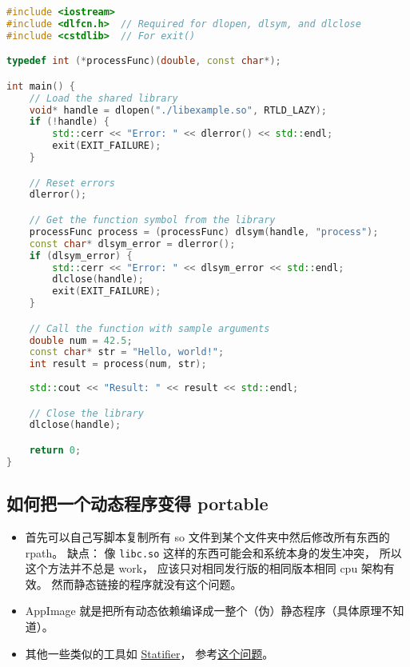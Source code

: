 \begin{lstlisting}[language=cpp]
#include <iostream>
#include <dlfcn.h>  // Required for dlopen, dlsym, and dlclose
#include <cstdlib>  // For exit()

typedef int (*processFunc)(double, const char*);

int main() {
    // Load the shared library
    void* handle = dlopen("./libexample.so", RTLD_LAZY);
    if (!handle) {
        std::cerr << "Error: " << dlerror() << std::endl;
        exit(EXIT_FAILURE);
    }

    // Reset errors
    dlerror();

    // Get the function symbol from the library
    processFunc process = (processFunc) dlsym(handle, "process");
    const char* dlsym_error = dlerror();
    if (dlsym_error) {
        std::cerr << "Error: " << dlsym_error << std::endl;
        dlclose(handle);
        exit(EXIT_FAILURE);
    }

    // Call the function with sample arguments
    double num = 42.5;
    const char* str = "Hello, world!";
    int result = process(num, str);
    
    std::cout << "Result: " << result << std::endl;

    // Close the library
    dlclose(handle);

    return 0;
}

\end{lstlisting}

\subsection{如何把一个动态程序变得 portable}
\begin{itemize}
\item 首先可以自己写脚本复制所有 so 文件到某个文件夹中然后修改所有东西的 rpath。 缺点： 像 \verb`libc.so` 这样的东西可能会和系统本身的发生冲突， 所以这个方法并不总是 work， 应该只对相同发行版的相同版本相同 cpu 架构有效。 然而静态链接的程序就没有这个问题。
\item AppImage 就是把所有动态依赖编译成一整个（伪）静态程序（具体原理不知道）。
\item 其他一些类似的工具如 \href{https://statifier.sourceforge.net/}{Statifier}， 参考\href{https://askubuntu.com/questions/537479/is-there-any-open-source-way-to-make-a-static-from-a-dynamic-executable-with-no}{这个问题}。
\end{itemize}

